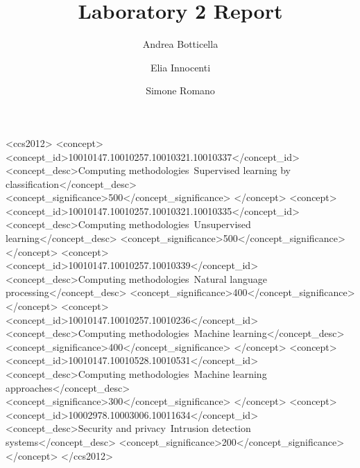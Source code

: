 \documentclass[acmlarge]{template/column-format-template/acmart}
\begin{document}

\title{Laboratory 2 Report}

\author{Andrea Botticella}

\author{Elia Innocenti}
\authornotemark[1]

\author{Simone Romano}
\authornotemark[1]

\renewcommand{\shortauthors}{Botticella, Innocenti, and Romano}


\begin{CCSXML}
<ccs2012>
   <concept>
       <concept_id>10010147.10010257.10010321.10010337</concept_id>
       <concept_desc>Computing methodologies~Supervised learning by classification</concept_desc>
       <concept_significance>500</concept_significance>
   </concept>
   <concept>
       <concept_id>10010147.10010257.10010321.10010335</concept_id>
       <concept_desc>Computing methodologies~Unsupervised learning</concept_desc>
       <concept_significance>500</concept_significance>
   </concept>
   <concept>
       <concept_id>10010147.10010257.10010339</concept_id>
       <concept_desc>Computing methodologies~Natural language processing</concept_desc>
       <concept_significance>400</concept_significance>
   </concept>
   <concept>
       <concept_id>10010147.10010257.10010236</concept_id>
       <concept_desc>Computing methodologies~Machine learning</concept_desc>
       <concept_significance>400</concept_significance>
   </concept>
   <concept>
       <concept_id>10010147.10010528.10010531</concept_id>
       <concept_desc>Computing methodologies~Machine learning approaches</concept_desc>
       <concept_significance>300</concept_significance>
   </concept>
   <concept>
       <concept_id>10002978.10003006.10011634</concept_id>
       <concept_desc>Security and privacy~Intrusion detection systems</concept_desc>
       <concept_significance>200</concept_significance>
   </concept>
</ccs2012>
\end{CCSXML}
\end{document}
